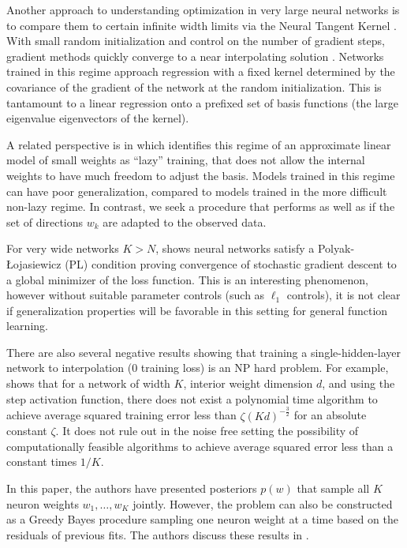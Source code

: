 \documentclass{article}
\numberwithin{equation}{section}
\theoremstyle{Lemma}
\theoremstyle{Corollary}
\theoremstyle{Theorem}
\theoremstyle{Remark}
\begin{document}
Another approach to understanding optimization in very large neural networks is to compare them to certain infinite width limits via the Neural Tangent Kernel \cite{jacot2018neural}. With small random initialization and control on the number of gradient steps, gradient methods quickly converge to a near interpolating solution \cite{allen2019convergence,du2019gradient,zou2020gradient}. Networks trained in this regime approach regression with a fixed kernel determined by the covariance of the gradient of the network at the random initialization. This is tantamount to a linear regression onto a prefixed set of basis functions (the large eigenvalue eigenvectors of the kernel).

A related perspective is in \cite{chizat2019lazy} which identifies this regime of an approximate linear model of small weights as ``lazy'' training, that does not allow the internal weights to have much freedom to adjust the basis. Models trained in this regime can have poor generalization, compared to models trained in the more difficult non-lazy regime. In contrast, we seek a procedure that performs as well as if the set of directions $w_{k}$ are adapted to the observed data.

For very wide networks $K > N$, \cite{liu2022loss} shows neural networks satisfy a  Polyak-Łojasiewicz (PL) condition proving convergence of stochastic gradient descent to a global minimizer of the loss function. This is an interesting phenomenon, however without suitable parameter controls (such as $\ell_1$ controls), it is not clear if generalization properties will be favorable in this setting for general function learning.

There are also several negative results \cite{dey2020approximation, goel_et_al:LIPIcs.ITCS.2021.22, froese2024training} showing that training a single-hidden-layer network to interpolation (0 training loss) is an NP hard problem. For example, \cite{vu1998infeasibility} shows that for a network of width $K$, interior weight dimension $d$, and using the step activation function, there does not exist a polynomial time algorithm to achieve average squared training error less than $\zeta (Kd)^{-\frac{3}{2}}$ for an absolute constant $\zeta$. It does not rule out in the noise free setting the possibility of computationally feasible algorithms to achieve average squared error less than a constant times $1/K$.

In this paper, the authors have presented posteriors $p(w)$ that sample all $K$ neuron weights $w_{1}, \ldots, w_{K}$ jointly. However, the problem can also be constructed as a Greedy Bayes procedure sampling one neuron weight at a time based on the residuals of previous fits. The authors discuss these results in \cite{mcdonald2024log_ISIT, barron2024log, barron2024shannon,mcdonald2025computation_thesis}. 
\end{document}
